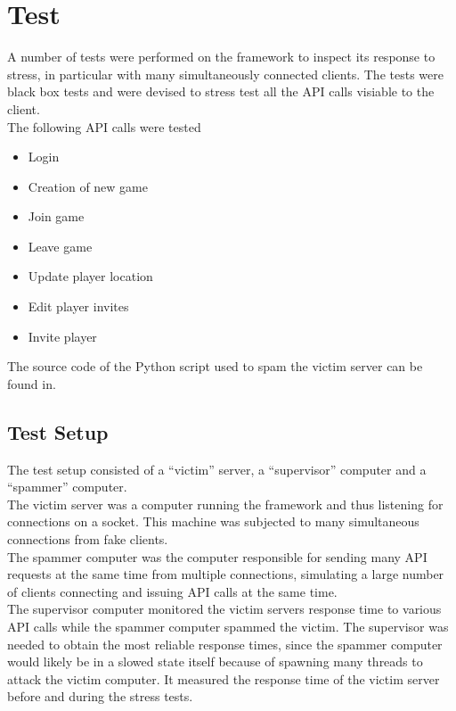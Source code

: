 \section{Test}
A number of tests were performed on the framework to inspect its response to stress, in particular with many simultaneously connected clients. The tests were black box tests and were devised to stress test all the API calls visiable to the client.\\

The following API calls were tested
\begin{itemize}
\item Login
\item Creation of new game
\item Join game
\item Leave game
\item Update player location
\item Edit player invites
\item Invite player
\end{itemize}

The source code of the Python script used to spam the victim server can be found in.
\subsection{Test Setup}
\label{sec:testSetup}
The test setup consisted of a ``victim'' server, a ``supervisor'' computer and a ``spammer'' computer.\\

The victim server was a computer running the framework and thus listening for connections on a socket. This machine was subjected to many simultaneous connections from fake clients.\\

The spammer computer was the computer responsible for sending many API requests at the same time from multiple connections, simulating a large number of clients connecting and issuing API calls at the same time.\\

The supervisor computer monitored the victim servers response time to various API calls while the spammer computer spammed the victim. The supervisor was needed to obtain the most reliable response times, since the spammer computer would likely be in a slowed state itself because of spawning many threads to attack the victim computer. It measured the response time of the victim server before and during the stress tests.\\

